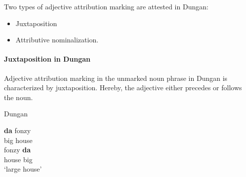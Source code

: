Two types of adjective attribution marking are attested in Dungan:
\begin{itemize}
\item Juxtaposition
\item Attributive nominalization.
\end{itemize}

\paragraph{Juxtaposition in Dungan}
Adjective attribution marking in the unmarked noun phrase in Dungan is characterized by juxtaposition. Hereby, the adjective either precedes or follows the noun.
\begin{exe}
\ex \rm{Dungan \citep[480]{kalimov1968}} \label{dungan juxtap}
\begin{xlist}
\ex 	
\gll	\textbf{da} fonzy\\
	big house\\
\ex
\gll	fonzy \textbf{da}\\
	house big\\
\glt	‘large house’
\end{xlist}
\end{exe}

